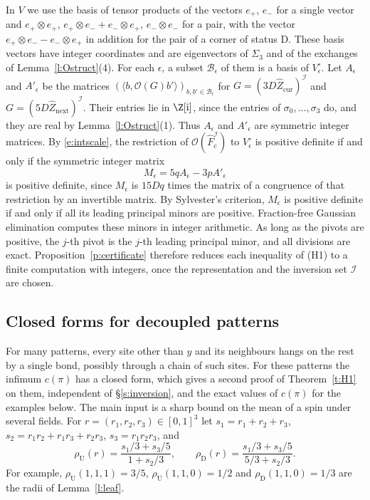 In $V$ we use the basis of tensor products of the vectors $e_+$, $e_-$ for a single vector and $e_+ \otimes e_+$, $e_+ \otimes e_- + e_- \otimes e_+$, $e_- \otimes e_-$ for a pair, with the vector $e_+ \otimes e_- - e_- \otimes e_+$ in addition for the pair of a corner of status $\mathrm D$. These basis vectors have integer coordinates and are eigenvectors of $\Sigma_3$ and of the exchanges of Lemma~\ref{l:Ostruct}(4). For each $\epsilon$, a subset $\mathcal B_\epsilon$ of them is a basis of $V_\epsilon^{\circ}$. Let $A_\epsilon$ and $A'_\epsilon$ be the matrices $(\langle b, \mathcal O(G) b' \rangle)_{b, b' \in \mathcal B_\epsilon}$ for $G = (3 D \hat Z_{\mathrm{cur}})^{\mathcal I}$ and $G = (5 D \hat Z_{\mathrm{next}})^{\mathcal I}$. Their entries lie in $\Z[\mathrm i]$, since the entries of $\sigma_0, \dots, \sigma_3$ do, and they are real by Lemma~\ref{l:Ostruct}(1). Thus $A_\epsilon$ and $A'_\epsilon$ are symmetric integer matrices. By \eqref{e:intscale}, the restriction of $\mathcal O(\hat F_c^{\mathcal I})$ to $V_\epsilon^{\circ}$ is positive definite if and only if the symmetric integer matrix
\begin{equation}\label{e:Meps}
M_\epsilon = 5 q A_\epsilon - 3 p A'_\epsilon
\end{equation}
is positive definite, since $M_\epsilon$ is $15 D q$ times the matrix of a congruence of that restriction by an invertible matrix. By Sylvester's criterion, $M_\epsilon$ is positive definite if and only if all its leading principal minors are positive. Fraction-free Gaussian elimination \cite{Bar68} computes these minors in integer arithmetic. As long as the pivots are positive, the $j$-th pivot is the $j$-th leading principal minor, and all divisions are exact. Proposition~\ref{p:certificate} therefore reduces each inequality of (H1) to a finite computation with integers, once the representation and the inversion set $\mathcal I$ are chosen.

\subsection{Closed forms for decoupled patterns}\label{s:closed}

For many patterns, every site other than $y$ and its neighbours hangs on the rest by a single bond, possibly through a chain of such sites. For these patterns the infimum $c(\pi)$ has a closed form, which gives a second proof of Theorem~\ref{t:H1} on them, independent of \S\ref{s:inversion}, and the exact values of $c(\pi)$ for the examples below. The main input is a sharp bound on the mean of a spin under several fields. For $r = (r_1, r_2, r_3) \in [0, 1]^3$ let $s_1 = r_1 + r_2 + r_3$, $s_2 = r_1 r_2 + r_1 r_3 + r_2 r_3$, $s_3 = r_1 r_2 r_3$, and
\begin{equation}\label{e:rhoUD}
\rho_{\mathrm U}(r) = \frac{s_1/3 + s_3/5}{1 + s_2/3}, \qquad \rho_{\mathrm D}(r) = \frac{s_1/3 + s_3/5}{5/3 + s_2/3} .
\end{equation}
For example, $\rho_{\mathrm U}(1, 1, 1) = 3/5$, $\rho_{\mathrm U}(1, 1, 0) = 1/2$ and $\rho_{\mathrm D}(1, 1, 0) = 1/3$ are the radii of Lemma~\ref{l:leaf}.

